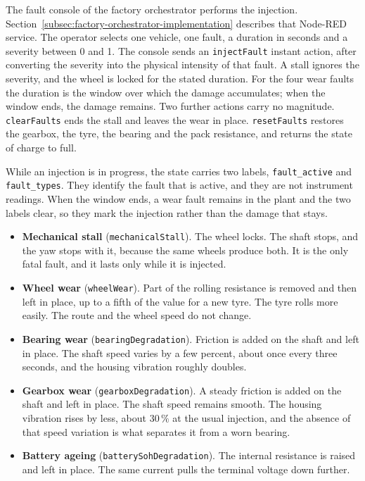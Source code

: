 The fault console of the factory orchestrator performs the injection. Section~\ref{subsec:factory-orchestrator-implementation} describes that Node-RED service. The operator selects one vehicle, one fault, a duration in seconds and a severity between 0 and 1. The console sends an \texttt{injectFault} instant action, after converting the severity into the physical intensity of that fault. A stall ignores the severity, and the wheel is locked for the stated duration. For the four wear faults the duration is the window over which the damage accumulates; when the window ends, the damage remains. Two further actions carry no magnitude. \texttt{clearFaults} ends the stall and leaves the wear in place. \texttt{resetFaults} restores the gearbox, the tyre, the bearing and the pack resistance, and returns the state of charge to full.

While an injection is in progress, the state carries two labels, \texttt{fault\_active} and \texttt{fault\_types}. They identify the fault that is active, and they are not instrument readings. When the window ends, a wear fault remains in the plant and the two labels clear, so they mark the injection rather than the damage that stays.

\begin{itemize}
    \item \textbf{Mechanical stall} (\texttt{mechanicalStall}). The wheel locks. The shaft stops, and the yaw stops with it, because the same wheels produce both. It is the only fatal fault, and it lasts only while it is injected.
    \item \textbf{Wheel wear} (\texttt{wheelWear}). Part of the rolling resistance is removed and then left in place, up to a fifth of the value for a new tyre. The tyre rolls more easily. The route and the wheel speed do not change.
    \item \textbf{Bearing wear} (\texttt{bearingDegradation}). Friction is added on the shaft and left in place. The shaft speed varies by a few percent, about once every three seconds, and the housing vibration roughly doubles.
    \item \textbf{Gearbox wear} (\texttt{gearboxDegradation}). A steady friction is added on the shaft and left in place. The shaft speed remains smooth. The housing vibration rises by less, about $30\,\%$ at the usual injection, and the absence of that speed variation is what separates it from a worn bearing.
    \item \textbf{Battery ageing} (\texttt{batterySohDegradation}). The internal resistance is raised and left in place. The same current pulls the terminal voltage down further.
\end{itemize}

